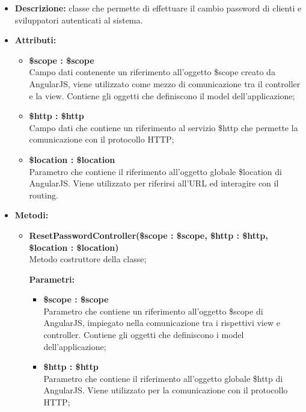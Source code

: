 \begin{itemize}
	\item \textbf{Descrizione:} classe che permette di effettuare il cambio password di clienti e sviluppatori autenticati al sistema.
	\item \textbf{Attributi:}
	\begin{itemize}
		
		\item \textbf{\$scope : \$scope}\\
		Campo dati contenente un riferimento all'oggetto \$scope creato da AngularJS, viene utilizzato come mezzo di comunicazione tra il controller e la view. Contiene gli oggetti che definiscono il model dell'applicazione;
		
		\item \textbf{\$http : \$http }\\
		Campo dati che contiene un riferimento al servizio \$http che permette la comunicazione con il protocollo HTTP;
		
		\item \textbf{\$location : \$location}\\
		Parametro che contiene il riferimento all'oggetto globale \$location di AngularJS. Viene utilizzato per riferirsi all'URL ed interagire con il routing.
		
	\end{itemize}
	\item \textbf{Metodi:}
	\begin{itemize}
		
		\item \textbf{ResetPasswordController(\$scope : \$scope, \$http : \$http, \$location : \$location)}\\
		Metodo costruttore della classe;
		\begin{description}
			\item[\textbf{Parametri:}]
		\end{description}
		\begin{itemize}
			\item \textbf{\$scope : \$scope}\\
			Parametro che contiene un riferimento all'oggetto \$scope di AngularJS, impiegato nella comunicazione tra i rispettivi view e controller. Contiene gli oggetti che definiscono i model dell'applicazione;
			
			\item \textbf{\$http : \$http}\\
			Parametro che contiene il riferimento all'oggetto globale \$http di AngularJS. Viene utilizzato per la comunicazione con il protocollo HTTP;
			

\end{itemize}
\end{itemize}
\end{itemize}
